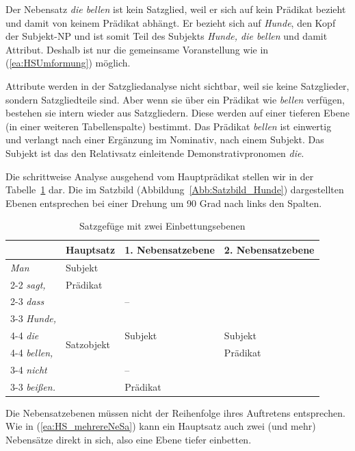 Der Nebensatz \textit{die bellen} ist kein Satzglied, weil er sich auf kein Prädikat bezieht und damit von keinem Prädikat abhängt. Er bezieht sich auf \textit{Hunde}, den Kopf der Subjekt-NP und ist somit Teil des Subjekts \textit{Hunde, die bellen} und damit Attribut. Deshalb ist nur die gemeinsame Voranstellung wie in (\ref{ea:HSUmformung}) möglich.

Attribute werden in der Satzgliedanalyse nicht sichtbar, weil sie keine Satzglieder, sondern Satzgliedteile sind. Aber wenn sie über ein Prädikat wie \textit{bellen} verfügen, bestehen sie intern wieder aus Satzgliedern. Diese werden auf einer tieferen Ebene (in einer weiteren Tabellenspalte) bestimmt. Das Prädikat \textit{bellen} ist einwertig und verlangt nach einer Ergänzung im Nominativ, nach einem Subjekt. Das Subjekt ist das den Relativsatz einleitende Demonstrativpronomen \textit{die}.

Die schrittweise Analyse ausgehend vom Hauptprädikat stellen wir in der Tabelle~\ref{tab:Satzgefüge1} dar. Die im Satzbild (Abbildung~\ref{Abb:Satzbild_Hunde}) dargestellten Ebenen entsprechen bei einer Drehung um 90 Grad nach links den Spalten.

\begin{table}
  \centering
  \begin{tabular}{l|l|l|l}
     & Hauptsatz & 1. Nebensatzebene & 2. Nebensatzebene \\
    \hline
    \textit{Man} & Subjekt &  & \\
    \cline{2-2} 
    \textit{sagt,} & Prädikat & & \\
    \cline{2-3}
    \textit{dass} & \multirow{6}{*}{Satzobjekt} & -- & \\ \cline{3-3}
    \textit{Hunde,} &  & \multirow{3}{*}{Subjekt} & \\ \cline{4-4}
    \textit{die} & & & Subjekt \\ \cline{4-4}
    \textit{bellen,} & & & Prädikat  \\ \cline{3-4}
    \textit{nicht} & & -- & \\ \cline{3-3}
    \textit{beißen.} & & Prädikat & \\ 
    \hline 
  \end{tabular}
  \caption{Satzgefüge mit zwei Einbettungsebenen}
  \label{tab:Satzgefüge1}
\end{table}

Die Nebensatzebenen müssen nicht der Reihenfolge ihres Auftretens entsprechen. Wie in (\ref{ea:HS_mehrereNeSa}) kann ein Hauptsatz auch zwei (und mehr) Nebensätze direkt in sich, also eine Ebene tiefer einbetten. 

